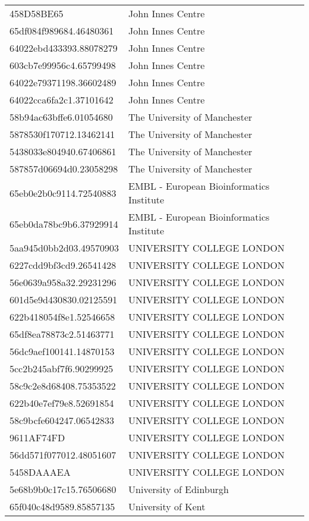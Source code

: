 \begin{tabular}{ll}
458D58BE65 & John Innes Centre \\
65df084f989684.46480361 & John Innes Centre \\
64022ebd433393.88078279 & John Innes Centre \\
603cb7e99956c4.65799498 & John Innes Centre \\
64022e79371198.36602489 & John Innes Centre \\
64022cca6fa2c1.37101642 & John Innes Centre \\
58b94ac63bffe6.01054680 & The University of Manchester \\
5878530f170712.13462141 & The University of Manchester \\
5438033e804940.67406861 & The University of Manchester \\
587857d06694d0.23058298 & The University of Manchester \\
65eb0e2b0c9114.72540883 & EMBL - European Bioinformatics Institute \\
65eb0da78bc9b6.37929914 & EMBL - European Bioinformatics Institute \\
5aa945d0bb2d03.49570903 & UNIVERSITY COLLEGE LONDON \\
6227cdd9bf3cd9.26541428 & UNIVERSITY COLLEGE LONDON \\
56e0639a958a32.29231296 & UNIVERSITY COLLEGE LONDON \\
601d5e9d430830.02125591 & UNIVERSITY COLLEGE LONDON \\
622b418054f8e1.52546658 & UNIVERSITY COLLEGE LONDON \\
65df8ea78873c2.51463771 & UNIVERSITY COLLEGE LONDON \\
56dc9aef100141.14870153 & UNIVERSITY COLLEGE LONDON \\
5cc2b245abf7f6.90299925 & UNIVERSITY COLLEGE LONDON \\
58c9c2e8d68408.75353522 & UNIVERSITY COLLEGE LONDON \\
622b40e7ef79e8.52691854 & UNIVERSITY COLLEGE LONDON \\
58c9bcfe604247.06542833 & UNIVERSITY COLLEGE LONDON \\
9611AF74FD & UNIVERSITY COLLEGE LONDON \\
56dd571f077012.48051607 & UNIVERSITY COLLEGE LONDON \\
5458DAAAEA & UNIVERSITY COLLEGE LONDON \\
5e68b9b0c17c15.76506680 & University of Edinburgh \\
65f040c48d9589.85857135 & University of Kent \\

\end{tabular}

